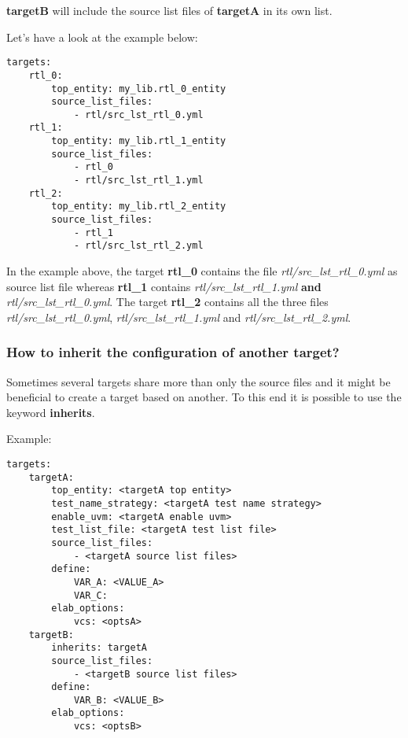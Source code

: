 \documentclass{tropic_design_spec}
\begin{document}
\textbf{targetB} will include the source list files of \textbf{targetA} in its own list.

Let's have a look at the example below:
\begin{lstlisting}
targets:
    rtl_0:
        top_entity: my_lib.rtl_0_entity
        source_list_files:
            - rtl/src_lst_rtl_0.yml
    rtl_1:
        top_entity: my_lib.rtl_1_entity
        source_list_files:
            - rtl_0
            - rtl/src_lst_rtl_1.yml
    rtl_2:
        top_entity: my_lib.rtl_2_entity
        source_list_files:
            - rtl_1
            - rtl/src_lst_rtl_2.yml
\end{lstlisting}

In the example above, the target \textbf{rtl_0} contains the file \textit{rtl/src_lst_rtl_0.yml}
as source list file whereas \textbf{rtl_1} contains \textit{rtl/src_lst_rtl_1.yml} \textbf{and}
\textit{rtl/src_lst_rtl_0.yml}. The target \textbf{rtl_2} contains all the three files
\textit{rtl/src_lst_rtl_0.yml}, \textit{rtl/src_lst_rtl_1.yml} and
\textit{rtl/src_lst_rtl_2.yml}.


\subsubsection{How to inherit the configuration of another target?}
\label{sec:how-to-inherit-the-configuration-of-another-target}

Sometimes several targets share more than only the source files and it might be
beneficial to create a target based on another.
To this end it is possible to use the keyword \textbf{inherits}.

Example:
\begin{lstlisting}
targets:
    targetA:
        top_entity: <targetA top entity>
        test_name_strategy: <targetA test name strategy>
        enable_uvm: <targetA enable uvm>
        test_list_file: <targetA test list file>
        source_list_files:
            - <targetA source list files>
        define:
            VAR_A: <VALUE_A>
            VAR_C:
        elab_options:
            vcs: <optsA>
    targetB:
        inherits: targetA
        source_list_files:
            - <targetB source list files>
        define:
            VAR_B: <VALUE_B>
        elab_options:
            vcs: <optsB>
\end{lstlisting}
\end{document}
